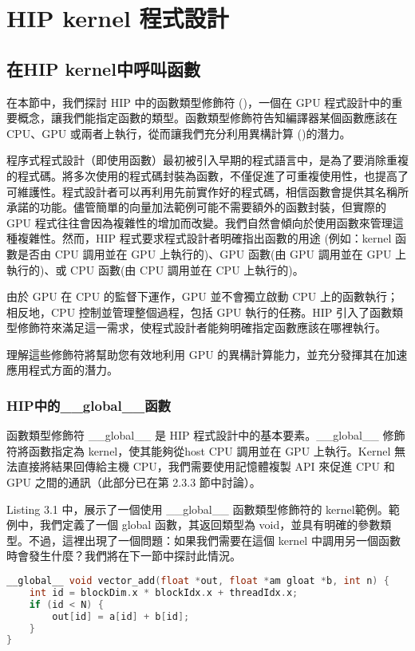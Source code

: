 \chapter{HIP kernel 程式設計}
\section{在HIP kernel中呼叫函數}
在本節中，我們探討 HIP 中的函數類型修飾符 ()，一個在 GPU 程式設計中的重要概念，讓我們能指定函數的類型。函數類型修飾符告知編譯器某個函數應該在 CPU、GPU 或兩者上執行，從而讓我們充分利用異構計算 ()的潛力。

程序式程式設計（即使用函數）最初被引入早期的程式語言中，是為了要消除重複的程式碼。將多次使用的程式碼封裝為函數，不僅促進了可重複使用性，也提高了可維護性。程式設計者可以再利用先前實作好的程式碼，相信函數會提供其名稱所承諾的功能。儘管簡單的向量加法範例可能不需要額外的函數封裝，但實際的 GPU 程式往往會因為複雜性的增加而改變。我們自然會傾向於使用函數來管理這種複雜性。然而，HIP 程式要求程式設計者明確指出函數的用途 (例如：kernel 函數是否由 CPU 調用並在 GPU 上執行的)、GPU 函數(由 GPU 調用並在 GPU 上執行的)、或 CPU 函數(由 CPU 調用並在 CPU 上執行的)。

由於 GPU 在 CPU 的監督下運作，GPU 並不會獨立啟動 CPU 上的函數執行；相反地，CPU 控制並管理整個過程，包括 GPU 執行的任務。HIP 引入了函數類型修飾符來滿足這一需求，使程式設計者能夠明確指定函數應該在哪裡執行。

理解這些修飾符將幫助您有效地利用 GPU 的異構計算能力，並充分發揮其在加速應用程式方面的潛力。

\subsection{HIP中的\_\_global\_\_函數}

函數類型修飾符 \_\_global\_\_ 是 HIP 程式設計中的基本要素。\_\_global\_\_ 修飾符將函數指定為 kernel，使其能夠從host CPU 調用並在 GPU 上執行。Kernel 無法直接將結果回傳給主機 CPU，我們需要使用記憶體複製 API 來促進 CPU 和 GPU 之間的通訊（此部分已在第 2.3.3 節中討論）。

Listing 3.1 中，展示了一個使用 \_\_global\_\_ 函數類型修飾符的 kernel範例。範例中，我們定義了一個 global 函數，其返回類型為 void，並具有明確的參數類型。不過，這裡出現了一個問題：如果我們需要在這個 kernel 中調用另一個函數時會發生什麼？我們將在下一節中探討此情況。

\begin{lstlisting}[language=C, caption={在HIP kernel中使用\_\_global\_\_函數}, label={lst:example}]
__global__ void vector_add(float *out, float *am gloat *b, int n) {
    int id = blockDim.x * blockIdx.x + threadIdx.x;
    if (id < N) {
        out[id] = a[id] + b[id];
    }
}
\end{lstlisting}

